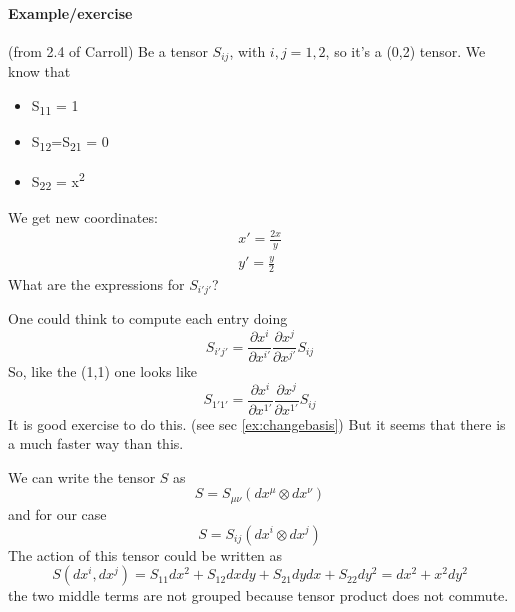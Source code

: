 \paragraph{Example/exercise} (from 2.4 of Carroll)
Be a tensor $S_{ij}$, with $i,j =1,2$, so it's a (0,2) tensor.
We know that
\begin{itemize}
	\item S\textsubscript{11} = 1
	\item S\textsubscript{12}=S\textsubscript{21} = 0
	\item S\textsubscript{22} = x\textsuperscript{2}
\end{itemize}
We get new coordinates:
\begin{gather*}
x' = \frac{2x}{y} \\
y' = \frac{y}{2}
\end{gather*}
What are the expressions for $S_{i'j'}$?\par
One could think to compute each entry doing
\[
S_{i'j'}= \frac{\partial x^{i}}{\partial x^{i'}} \frac{\partial x^{j}}{\partial x^{j'}} S_{ij}
\]
So, like the (1,1) one looks like
\[
S_{1'1'} = \frac{\partial x^{i}}{\partial x^{1'}} \frac{\partial x^{j}}{\partial x^{1'}} S_{ij}
\]
It is good exercise to do this. (see sec \ref{ex:changebasis})
But it seems that there is a much faster way than this.\par
We can write the tensor $S$ as
\[
S = S_{\mu \nu }\left( dx^{\mu } \otimes dx^{\nu } \right)
\]
and for our case 
\[
S = S_{ij}\left( dx^{i} \otimes dx^{j} \right)
\]
The action of this tensor could be written as 
\begin{equation}\label{eq:1}
S \left( dx^{i},dx^{j} \right) = S_{11}dx^{2} + S_{12}dxdy + S_{21}dydx + S_{22}dy^{2} = dx^{2} +x^{2}dy^{2}		
\end{equation}
the two middle terms are not grouped because tensor product does not commute.\par

